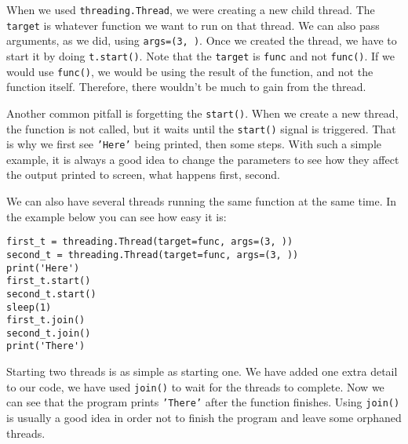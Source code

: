 When we used \texttt{threading.Thread}, we were creating a new child thread. The \texttt{target} is whatever function we want to run on that thread. We can also pass arguments, as we did, using \texttt{args=(3, )}. Once we created the thread, we have to start it by doing \texttt{t.start()}. Note that the \texttt{target} is \texttt{func} and not \texttt{func()}. If we would use \texttt{func()}, we would be using the result of the function, and not the function itself. Therefore, there wouldn't be much to gain from the thread.


Another common pitfall is forgetting the \texttt{start()}. When we create a new thread, the function is not called, but it waits until the \texttt{start()} signal is triggered. That is why we first see \texttt{'Here'} being printed, then some steps. With such a simple example, it is always a good idea to change the parameters to see how they affect the output printed to screen, what happens first, second.

We can also have several threads running the same function at the same time. In the example below you can see how easy it is:

\begin{verbatim}
first_t = threading.Thread(target=func, args=(3, ))
second_t = threading.Thread(target=func, args=(3, ))
print('Here')
first_t.start()
second_t.start()
sleep(1)
first_t.join()
second_t.join()
print('There')
\end{verbatim}

Starting two threads is as simple as starting one. We have added one extra detail to our code, we have used \texttt{join()} to wait for the threads to complete. Now we can see that the program prints \texttt{'There'} after the function finishes. Using \texttt{join()} is usually a good idea in order not to finish the program and leave some orphaned threads.


